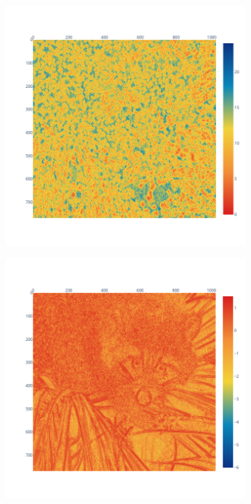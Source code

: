 \documentclass[11pt]{article}
\begin{document}
\begin{figure}
\begin{subfigure}{0.3\linewidth}
    \caption{}
    \label{fig:bspline_bisplev_std}
\end{subfigure}
\begin{subfigure}{0.3\linewidth}
    \includegraphics[width=\linewidth]{figure/bspline/convol2d_ret_sig_portland_r.png}
    \caption{}
    \label{fig:bspline_convol2d_sig}
\end{subfigure}
\begin{subfigure}{0.3\linewidth}
    \includegraphics[width=\linewidth]{figure/bspline/convol2d_ret_mean_log_portland.png}

\end{subfigure}
\end{figure}
\end{document}
